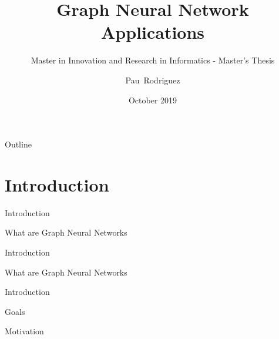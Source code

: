 \documentclass[xcolor=table]{beamer}
\title{Graph Neural Network Applications}
\subtitle{Master in Innovation and Research in Informatics - Master's Thesis}
\author{Pau~Rodriguez}
\institute[]
{
  Universitat Politecnica de Catalunya\\
  MIRI - Data Science
  }
\date{October 2019}
\begin{document}
\begin{frame}
  \titlepage
\end{frame}

\begin{frame}{Outline}
  \tableofcontents
\end{frame}



\section{Introduction}
\begin{frame}{Introduction}
    \begin{block}{What are Graph Neural Networks}
    {
    }
    \end{block}

\end{frame}


\begin{frame}{Introduction}
    \begin{block}{What are Graph Neural Networks}
    {
    }
    \end{block}

\end{frame}


\begin{frame}{Introduction}
    \begin{block}{Goals}
    {
    }
    \end{block}
    \begin{block}{Motivation}
    {
    }
    \end{block}
\end{frame}
\end{document}
